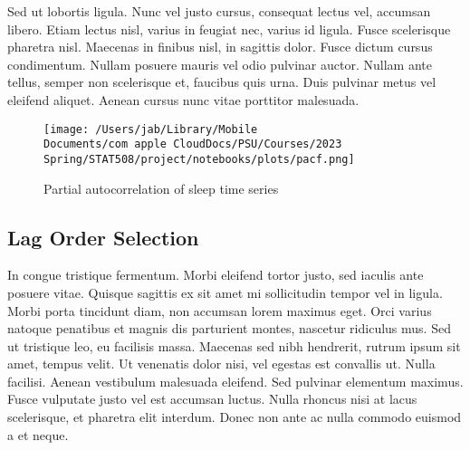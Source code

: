 \documentclass{article}
\begin{document}
Sed ut lobortis ligula. Nunc vel justo cursus, consequat lectus vel,
accumsan libero. Etiam lectus nisl, varius in feugiat nec, varius id
ligula. Fusce scelerisque pharetra nisl. Maecenas in finibus nisl, in
sagittis dolor. Fusce dictum cursus condimentum. Nullam posuere mauris
vel odio pulvinar auctor. Nullam ante tellus, semper non scelerisque et,
faucibus quis urna. Duis pulvinar metus vel eleifend aliquet. Aenean
cursus nunc vitae porttitor malesuada.

\begin{figure}
\centering
  \texttt{[image: /Users/jab/Library/Mobile Documents/com~apple~CloudDocs/PSU/Courses/2023 Spring/STAT508/project/notebooks/plots/pacf.png]}
\caption{Partial autocorrelation of sleep time series}
\end{figure}

\hypertarget{lag-order-selection}{%
\subsection{Lag Order Selection}\label{lag-order-selection}}

In congue tristique fermentum. Morbi eleifend tortor justo, sed iaculis
ante posuere vitae. Quisque sagittis ex sit amet mi sollicitudin tempor
vel in ligula. Morbi porta tincidunt diam, non accumsan lorem maximus
eget. Orci varius natoque penatibus et magnis dis parturient montes,
nascetur ridiculus mus. Sed ut tristique leo, eu facilisis massa.
Maecenas sed nibh hendrerit, rutrum ipsum sit amet, tempus velit. Ut
venenatis dolor nisi, vel egestas est convallis ut. Nulla facilisi.
Aenean vestibulum malesuada eleifend. Sed pulvinar elementum maximus.
Fusce vulputate justo vel est accumsan luctus. Nulla rhoncus nisi at
lacus scelerisque, et pharetra elit interdum. Donec non ante ac nulla
commodo euismod a et neque.
\end{document}
